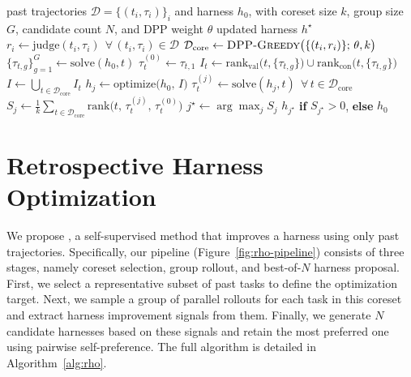 \begin{algorithm}[t]
\caption{ A single round of \method{}. One backbone instantiates every operator (the difficulty $\mathrm{judge}$, $\mathrm{solve}$, $\mathrm{optimize}$, and $\mathrm{rank}$), differing in its inputs and consulting no ground-truth label.}
\label{alg:rho}
\footnotesize
\begin{algorithmic}[1]
\Require past trajectories $\mathcal{D}{=}\{(t_i,\tau_i)\}_i$ and harness $h_0$, with coreset size $k$, group size $G$, candidate count $N$, and DPP weight $\theta$
\Ensure  updated harness $h^\star$
\State $r_i \gets \mathrm{judge}(t_i,\tau_i)\ \ \forall\,(t_i,\tau_i)\in\mathcal{D}$
\State $\mathcal{D}_{\mathrm{core}} \gets \textsc{DPP-Greedy}\bigl(\{(t_i,r_i)\};\,\theta,k\bigr)$
  \State $\{\tau_{t,g}\}_{g=1}^{G} \gets \mathrm{solve}(h_0,t)$ 
  \State $\tau_t^{(0)} \gets \tau_{t,1}$ 
  \State $I_t \gets \mathrm{rank}_{\mathrm{val}}\bigl(t,\{\tau_{t,g}\}\bigr)\cup\mathrm{rank}_{\mathrm{con}}\bigl(t,\{\tau_{t,g}\}\bigr)$
\EndFor
\State $I \gets \bigcup_{t\in\mathcal{D}_{\mathrm{core}}} I_t$
  \State $h_j \gets \mathrm{optimize}\bigl(h_0,\,I\bigr)$
  \State $\tau_t^{(j)} \gets \mathrm{solve}(h_j,t)\ \ \forall\,t\in\mathcal{D}_{\mathrm{core}}$ 
  \State $S_j \gets \tfrac{1}{k}\sum_{t\in\mathcal{D}_{\mathrm{core}}} \mathrm{rank}\bigl(t,\,\tau_t^{(j)},\,\tau_t^{(0)}\bigr)$
\EndFor
\State $j^\star \gets \arg\max_{j} S_j$
\State \Return $h_{j^\star}$ \textbf{if} $S_{j^\star}>0$, \textbf{else} $h_0$
\end{algorithmic}
\end{algorithm}



\section{Retrospective Harness Optimization}

 We propose \method{}, a self-supervised method that improves a harness using only past trajectories.
Specifically, our pipeline (Figure~\ref{fig:rho-pipeline}) consists of three stages, namely coreset selection, group rollout, and best-of-$N$ harness proposal.
First, we select a representative subset of past tasks to define the optimization target.
Next, we sample a group of parallel rollouts for each task in this coreset and extract harness improvement signals from them.
Finally, we generate $N$ candidate harnesses based on these signals and retain the most preferred one using pairwise self-preference.
The full algorithm is detailed in Algorithm~\ref{alg:rho}.

